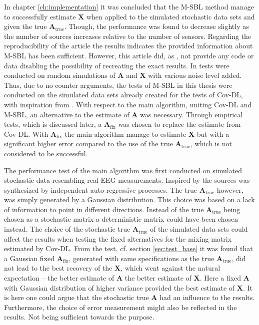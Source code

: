 In chapter \ref{ch:implementation} it was concluded that the M-SBL method manage to successfully estimate $\mathbf{X}$ when applied to the simulated stochastic data sets and given the true $\mathbf{A}_{\text{true}}$. 
Though, the performance was found to decrease slightly as the number of sources increases relative to the number of sensors. 
Regarding the reproducibility of the article \cite{Balkan2014} the results indicates the provided information about M-SBL has been sufficient.
However, this article did, as \cite{Balkan2015}, not provide any code or data disabling the possibility of recreating the exact results. In \cite{Balkan2014} tests were conducted on random simulations of $\mathbf{A}$ and $\mathbf{X}$ with various noise level added. 
Thus, due to no counter arguments, the tests of M-SBL in this thesis were conducted on the simulated data sets already created for the tests of Cov-DL, with inspiration from \cite{Balkan2014}.
With respect to the main algorithm, uniting Cov-DL and M-SBL, an alternative to the estimate of $\mathbf{A}$ was necessary. 
Through empirical tests, which is discussed later, a $\mathbf{A}_{\text{fix}}$ was chosen to replace the estimate from Cov-DL. 
With $\mathbf{A}_{\text{fix}}$ the main algorithm manage to estimate $\mathbf{X}$ but with a significant higher error compared to the use of the true $\mathbf{A}_{\text{true}}$, which is not considered to be successful.

The performance test of the main algorithm was first conducted on simulated stochastic data resembling real EEG measurements. 
Inspired by \cite{Balkan2015} the sources was synthesized by independent auto-regressive processes. 
The true $\mathbf{A}_{\text{true}}$ however, was simply generated by a Gaussian distribution. 
This choice was based on a lack of information to point in different directions. 
Instead of the true $\mathbf{A}_{\text{true}}$ being chosen as a stochastic matrix a deterministic matrix could have been chosen instead. 
The choice of the stochastic true $\mathbf{A}_{\text{true}}$ of the simulated data sets could affect the results when testing the fixed alternatives for the mixing matrix estimated by Cov-DL. 
From the test, cf. section \ref{sec:test_base} it was found that a Gaussian fixed $\mathbf{A}_{\text{fix}}$, generated with same specifications as the true $\mathbf{A}_{\text{true}}$, did not lead to the best recovery of the $\mathbf{X}$, which went against the natural expectation -- the better estimate of $\mathbf{A}$ the better estimate of $\mathbf{X}$. 
Here a fixed $\mathbf{A}$ with Gaussian distribution of higher variance provided the best estimate of $\mathbf{X}$. 
It is here one could argue that the stochastic true $\mathbf{A}$ had an influence to the results. 
Furthermore, the choice of error measurement might also be reflected in the results. Not being sufficient towards the purpose. 

